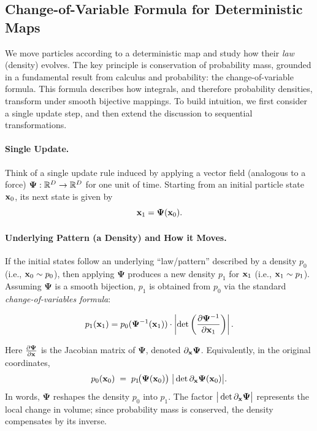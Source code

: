 \subsection{Change-of-Variable Formula for Deterministic Maps}\label{subsec:cov-det}
We move particles according to a deterministic map and study how their \emph{law} (density) evolves. The key principle is conservation of probability mass, grounded in a fundamental result from calculus and probability: the change-of-variable formula. This formula describes how integrals, and therefore probability densities, transform under smooth bijective mappings. To build intuition, we first consider a single update step, and then extend the discussion to sequential transformations.


\paragraph{Single Update.}
Think of a single update rule induced by applying a vector field (analogous to a force) 
$\bm{\Psi}:\mathbb{R}^D \to \mathbb{R}^D$ for one unit of time. 
Starting from an initial particle state ${\mathbf{x}}_0$, its next state is given by
\[
{\mathbf{x}}_1 = \bm{\Psi}({\mathbf{x}}_0).
\]

\paragraph{Underlying Pattern (a Density) and How it Moves.}
If the initial states follow an underlying ``law/pattern'' described by a density $p_0$ (i.e., ${\mathbf{x}}_0\sim p_0$),
then applying $\bm{\Psi}$ produces a new density $p_1$ for ${\mathbf{x}}_1$ (i.e., ${\mathbf{x}}_1\sim p_1$).
Assuming $\bm{\Psi}$ is a smooth bijection, $p_1$ is obtained from $p_0$ via the standard \emph{change-of-variables formula}:
\begin{mdframed}
\begin{equation}\label{eq:change-of-variable-density}
p_{1}({\mathbf{x}}_1) = p_{0}(\bm{\Psi}^{-1}({\mathbf{x}}_1)) \cdot \left| \det \left( \frac{\partial \bm{\Psi}^{-1}}{\partial {\mathbf{x}}_1} \right) \right|.
\end{equation}
\end{mdframed}
Here $\tfrac{\partial \bm{\Psi}}{\partial {\mathbf{x}}}$ is the Jacobian matrix of $\bm{\Psi}$, denoted $\partial_{\mathbf{x}} \bm{\Psi}$.  
Equivalently, in the original coordinates,
\[
p_0({\mathbf{x}}_0) \;=\; p_1\!\big(\bm{\Psi}({\mathbf{x}}_0)\big)\;\big|\det \partial_{\mathbf{x}} \bm{\Psi}({\mathbf{x}}_0)\big|.
\]
In words, $\bm{\Psi}$ reshapes the density $p_0$ into $p_1$. The factor $\big|\det \partial_{\mathbf{x}} \bm{\Psi}\big|$ represents the local change in volume; since probability mass is conserved, the density compensates by its inverse.  

